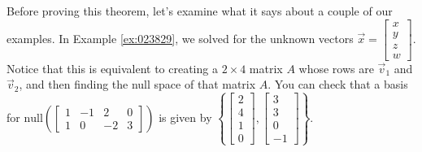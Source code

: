 \documentclass{ximera}
\begin{document}
Before proving this theorem, let's examine what it says about a couple of our examples.  In Example \ref{ex:023829}, we solved for the unknown vectors $\vec{x} = \begin{bmatrix}
  x \\ y \\ z \\ w
  \end{bmatrix}$. Notice that this is equivalent to creating a $2 \times 4$ matrix $A$ whose rows are $\vec{v}_1$ and $\vec{v}_2$, and then finding the null space of that matrix $A$.  You can check that a basis for $\mbox{null}\left(\begin{bmatrix}
  1 & -1 & 2 & 0 \\
  1 & 0 & -2 & 3
  \end{bmatrix}\right)$
is given by $\left\{\begin{bmatrix}
  2 \\ 4 \\ 1 \\ 0
  \end{bmatrix},
  \begin{bmatrix}
  3 \\ 3 \\ 0 \\ -1
  \end{bmatrix}\right\}$.
\end{document}
